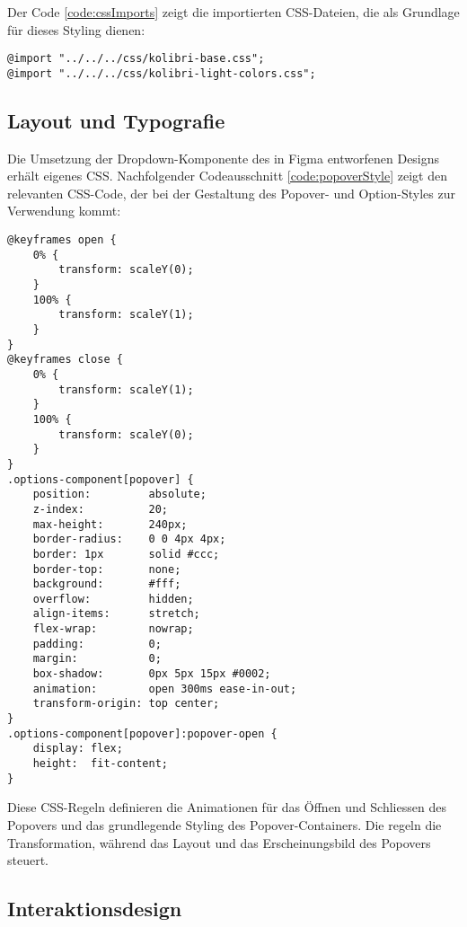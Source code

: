 \noindent
Der Code \ref{code:cssImports} zeigt die importierten CSS-Dateien, die als Grundlage für dieses Styling dienen:

\begin{lstlisting}[style = htmlcssjs, caption = CSS Imports, label = code:cssImports]
@import "../../../css/kolibri-base.css";
@import "../../../css/kolibri-light-colors.css";
\end{lstlisting}


\subsection{Layout und Typografie}
\label{sec:layoutTypo}

Die Umsetzung der Dropdown-Komponente des in Figma entworfenen Designs erhält eigenes CSS. 
Nachfolgender Codeausschnitt \ref{code:popoverStyle} zeigt den relevanten CSS-Code, der bei der Gestaltung des Popover- und Option-Styles zur Verwendung kommt:

\begin{lstlisting}[style = htmlcssjs, caption = CSS für das Popover-Element, label = code:popoverStyle]
@keyframes open {
    0% {
        transform: scaleY(0);
    }
    100% {
        transform: scaleY(1);
    }
}
@keyframes close {
    0% {
        transform: scaleY(1);
    }
    100% {
        transform: scaleY(0);
    }
}
.options-component[popover] {
    position:         absolute;
    z-index:          20;
    max-height:       240px;
    border-radius:    0 0 4px 4px;
    border: 1px       solid #ccc;
    border-top:       none;
    background:       #fff;
    overflow:         hidden;
    align-items:      stretch;
    flex-wrap:        nowrap;
    padding:          0;
    margin:           0;
    box-shadow:       0px 5px 15px #0002;
    animation:        open 300ms ease-in-out;
    transform-origin: top center;
}
.options-component[popover]:popover-open {
    display: flex;
    height:  fit-content;
} 
\end{lstlisting}

Diese CSS-Regeln definieren die Animationen für das Öffnen und Schliessen des Popovers und das grundlegende Styling des Popover-Containers. 
Die  regeln die Transformation, während  das Layout und das Erscheinungsbild des Popovers steuert. 


\subsection{Interaktionsdesign} %
\label{sec:interactionDesign}


